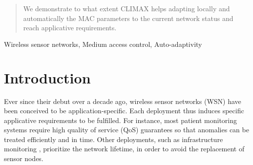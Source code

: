 \documentclass[12pt,journal,compsoc]{IEEEtran}
\begin{document}
{\begin{abstract}
We demonstrate to what extent CLIMAX helps adapting locally and automatically the MAC parameters to the current network status and reach applicative requirements.
\end{abstract}

\begin{IEEEkeywords}
Wireless sensor networks, Medium access control, Auto-adaptivity
\end{IEEEkeywords}}

\maketitle

\section{Introduction}
Ever since their debut over a decade ago, wireless sensor networks (WSN) have been conceived to be application-specific. Each deployment thus induces specific applicative requirements to be fulfilled. For instance, most patient monitoring systems \cite{dbg11wireless} require high quality of service (QoS) guarantees so that anomalies can be treated efficiently and in time. Other deployments, such as infrastructure monitoring \cite{kpc07health}, prioritize the network lifetime, in order to avoid the replacement of sensor nodes.
\end{document}
